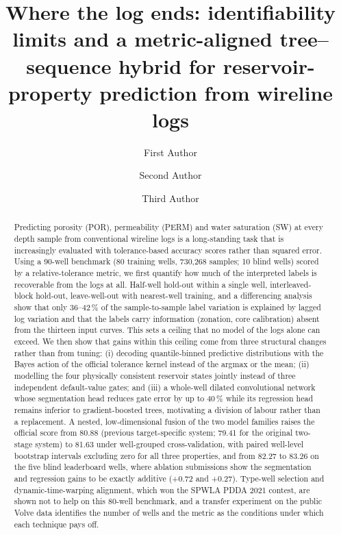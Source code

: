 \documentclass[preprint,12pt]{elsarticle}
\begin{document}
\begin{frontmatter}

\title{Where the log ends: identifiability limits and a metric-aligned tree--sequence hybrid for reservoir-property prediction from wireline logs}

\author[a]{First Author}
\author[a]{Second Author}
\author[b]{Third Author}

\begin{abstract}
Predicting porosity (POR), permeability (PERM) and water saturation (SW) at every depth sample from conventional wireline logs is a long-standing task that is increasingly evaluated with tolerance-based accuracy scores rather than squared error. Using a 90-well benchmark (80 training wells, 730,268 samples; 10 blind wells) scored by a relative-tolerance metric, we first quantify how much of the interpreted labels is recoverable from the logs at all. Half-well hold-out within a single well, interleaved-block hold-out, leave-well-out with nearest-well training, and a differencing analysis show that only 36--42\,\% of the sample-to-sample label variation is explained by lagged log variation and that the labels carry information (zonation, core calibration) absent from the thirteen input curves. This sets a ceiling that no model of the logs alone can exceed. We then show that gains within this ceiling come from three structural changes rather than from tuning: (i) decoding quantile-binned predictive distributions with the Bayes action of the official tolerance kernel instead of the argmax or the mean; (ii) modelling the four physically consistent reservoir states jointly instead of three independent default-value gates; and (iii) a whole-well dilated convolutional network whose segmentation head reduces gate error by up to 40\,\% while its regression head remains inferior to gradient-boosted trees, motivating a division of labour rather than a replacement. A nested, low-dimensional fusion of the two model families raises the official score from 80.88 (previous target-specific system; 79.41 for the original two-stage system) to 81.63 under well-grouped cross-validation, with paired well-level bootstrap intervals excluding zero for all three properties, and from 82.27 to 83.26 on the five blind leaderboard wells, where ablation submissions show the segmentation and regression gains to be exactly additive (+0.72 and +0.27). Type-well selection and dynamic-time-warping alignment, which won the SPWLA PDDA 2021 contest, are shown not to help on this 80-well benchmark, and a transfer experiment on the public Volve data identifies the number of wells and the metric as the conditions under which each technique pays off.
\end{abstract}


\end{frontmatter}
\end{document}
